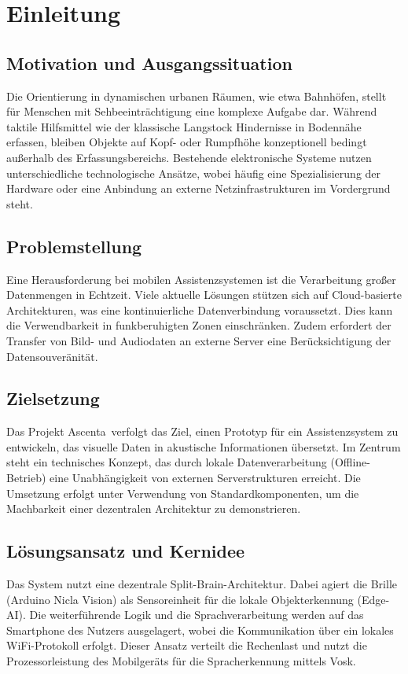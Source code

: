 
\chapter{Einleitung}

\section{Motivation und Ausgangssituation}
Die Orientierung in dynamischen urbanen Räumen, wie etwa Bahnhöfen, stellt für Menschen mit Sehbeeinträchtigung eine komplexe Aufgabe dar. Während taktile Hilfsmittel wie der klassische Langstock Hindernisse in Bodennähe erfassen, bleiben Objekte auf Kopf- oder Rumpfhöhe konzeptionell bedingt außerhalb des Erfassungsbereichs. Bestehende elektronische Systeme nutzen unterschiedliche technologische Ansätze, wobei häufig eine Spezialisierung der Hardware oder eine Anbindung an externe Netzinfrastrukturen im Vordergrund steht.

\section{Problemstellung}
Eine Herausforderung bei mobilen Assistenzsystemen ist die Verarbeitung großer Datenmengen in Echtzeit. Viele aktuelle Lösungen stützen sich auf Cloud-basierte Architekturen, was eine kontinuierliche Datenverbindung voraussetzt. Dies kann die Verwendbarkeit in funkberuhigten Zonen einschränken. Zudem erfordert der Transfer von Bild- und Audiodaten an externe Server eine Berücksichtigung der Datensouveränität.

\section{Zielsetzung}
Das Projekt \glqq Ascenta\grqq\ verfolgt das Ziel, einen Prototyp für ein Assistenzsystem zu entwickeln, das visuelle Daten in akustische Informationen übersetzt. Im Zentrum steht ein technisches Konzept, das durch lokale Datenverarbeitung (Offline-Betrieb) eine Unabhängigkeit von externen Serverstrukturen erreicht. Die Umsetzung erfolgt unter Verwendung von Standardkomponenten, um die Machbarkeit einer dezentralen Architektur zu demonstrieren.

\section{Lösungsansatz und Kernidee}
Das System nutzt eine dezentrale \glqq Split-Brain\grqq-Architektur. Dabei agiert die Brille (Arduino Nicla Vision) als Sensoreinheit für die lokale Objekterkennung (Edge-AI). Die weiterführende Logik und die Sprachverarbeitung werden auf das Smartphone des Nutzers ausgelagert, wobei die Kommunikation über ein lokales WiFi-Protokoll erfolgt. Dieser Ansatz verteilt die Rechenlast und nutzt die Prozessorleistung des Mobilgeräts für die Spracherkennung mittels Vosk.